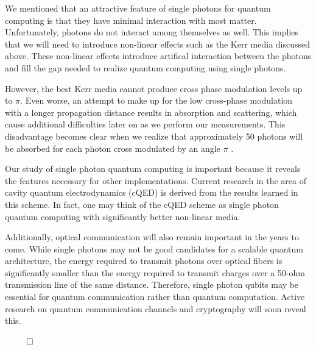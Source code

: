 We mentioned that an attractive feature of single photons for quantum computing is that they have minimal interaction with most matter. Unfortunately, photons do not interact among themselves as well. This implies that we will need to introduce non-linear effects such as the Kerr media discussed above. These non-linear effects introduce artifical interaction between the photons and fill the gap needed to realize quantum computing using single photons. 

However, the best Kerr media cannot produce cross phase modulation levels up to $\pi$. Even worse, an attempt to make up for the low cross-phase modulation with a longer propagation distance results in absorption and scattering, which cause additional difficulties later on as we perform our measurements. This disadvantage becomes clear when we realize that approximately 50 photons will be absorbed for each photon cross modulated by an angle $\pi$ \cite{nielsen2000}. 

Our study of single photon quantum computing is important because it reveals the features necessary for other implementations. Current research in the area of cavity quantum electrodynamics (cQED) is derived from the results learned in this scheme. In fact, one may think of the cQED scheme as single photon quantum computing with significantly better non-linear media.

Additionally, optical communication will also remain important in the years to come. While single photons may not be good candidates for a scalable quantum architecture, the energy required to transmit photons over optical fibers is significantly smaller than the energy required to transmit charges over a 50-ohm transmission line of the same distance. Therefore, single photon qubits may be essential for quantum communication rather than quantum computation. Active research on quantum communication channels and cryptography will soon reveal this.

~\hfill$\qed$
